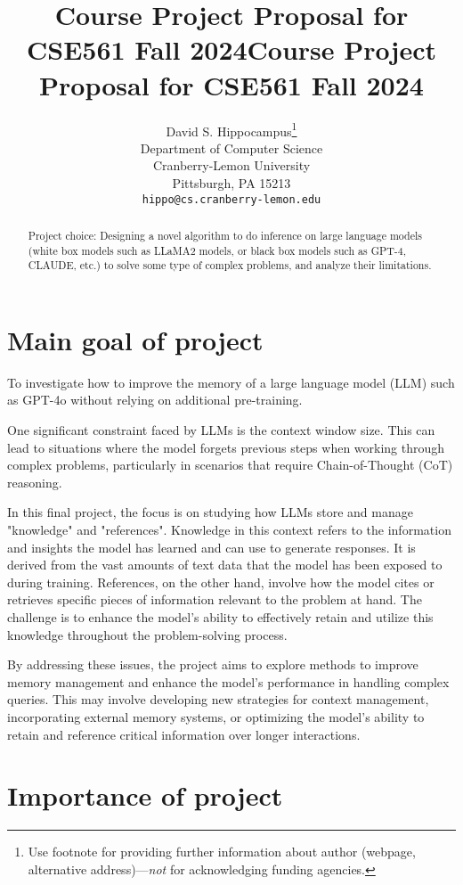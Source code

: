 \documentclass{article}
\title{Course Project Proposal for CSE561 Fall 2024}
\title{Course Project Proposal for CSE561 Fall 2024}
\author{%
  David S. Hippocampus\thanks{Use footnote for providing further information
    about author (webpage, alternative address)---\emph{not} for acknowledging
    funding agencies.} \\
  Department of Computer Science\\
  Cranberry-Lemon University\\
  Pittsburgh, PA 15213 \\
  \texttt{hippo@cs.cranberry-lemon.edu} \\
}
\begin{document}
\maketitle


\begin{abstract}
Project choice: Designing a novel algorithm to do inference on large language models (white box models such as LLaMA2 models, or black box models such as GPT-4, CLAUDE, etc.) to solve some type of complex problems, and analyze their limitations.
\end{abstract}


\section{Main goal of project}

To investigate how to improve the memory of a large language model (LLM) such as GPT-4o without relying on additional pre-training.

One significant constraint faced by LLMs is the context window size. This can lead to situations where the model forgets previous steps when working through complex problems, particularly in scenarios that require Chain-of-Thought (CoT) reasoning\cite{Wei2022ChainOT}.

In this final project, the focus is on studying how LLMs store and manage "knowledge" and "references". Knowledge in this context refers to the information and insights the model has learned and can use to generate responses. It is derived from the vast amounts of text data that the model has been exposed to during training. References, on the other hand, involve how the model cites or retrieves specific pieces of information relevant to the problem at hand. The challenge is to enhance the model's ability to effectively retain and utilize this knowledge throughout the problem-solving process.

By addressing these issues, the project aims to explore methods to improve memory management and enhance the model's performance in handling complex queries. This may involve developing new strategies for context management, incorporating external memory systems, or optimizing the model's ability to retain and reference critical information over longer interactions.

\section{Importance of project}
\end{document}

